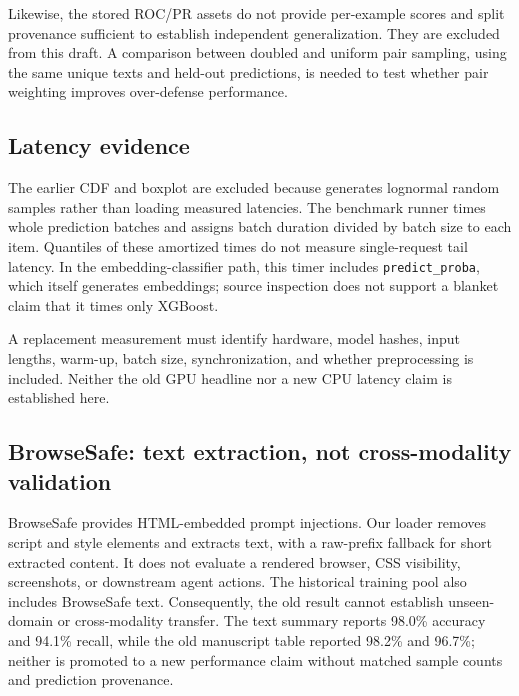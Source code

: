 \documentclass[11pt, a4paper]{article}
\begin{document}
Likewise, the stored ROC/PR assets do not provide per-example scores and
split provenance sufficient to establish independent generalization.
They are excluded from this draft. A comparison between doubled and uniform
pair sampling, using the same unique texts and held-out predictions, is
needed to test whether pair weighting improves over-defense performance.

\subsection{Latency evidence}
\label{sec:latency}
The earlier CDF and boxplot are excluded because
 generates lognormal random samples
rather than loading measured latencies. The benchmark runner times whole
prediction batches and assigns batch duration divided by batch size to
each item. Quantiles of these amortized times do not measure single-request
tail latency. In the embedding-classifier path, this timer includes
\texttt{predict\_proba}, which itself generates embeddings; source inspection
does not support a blanket claim that it times only XGBoost.

A replacement measurement must identify hardware, model hashes, input
lengths, warm-up, batch size, synchronization, and whether preprocessing
is included. Neither the old GPU headline nor a new CPU latency claim is
established here.

\subsection{BrowseSafe: text extraction, not cross-modality validation}
\label{sec:browsesafe}
BrowseSafe \citep{perplexity2025browsesafe} provides HTML-embedded prompt
injections. Our loader removes script and style elements and extracts text,
with a raw-prefix fallback for short extracted content. It does not evaluate
a rendered browser, CSS visibility, screenshots, or downstream agent actions.
The historical training pool also includes BrowseSafe text. Consequently,
the old result cannot establish unseen-domain or cross-modality transfer.
The text summary reports 98.0\% accuracy and 94.1\% recall, while the old
manuscript table reported 98.2\% and 96.7\%; neither is promoted to a new
performance claim without matched sample counts and prediction provenance.
\end{document}
